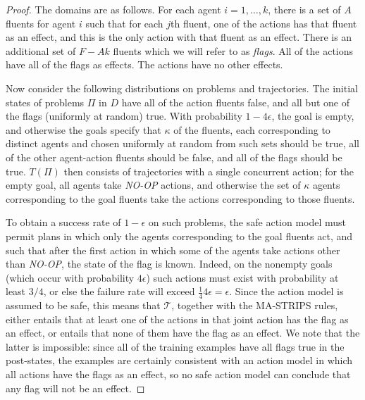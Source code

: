 \documentclass[letterpaper]{article} %
\theoremstyle{definition}
\theoremstyle{remark}
\newcommand{\noop}{\textit{NO-OP}\xspace}
\begin{document}
\begin{proof}
The domains are as follows. For each agent $i=1,\ldots,k$, there is a set of $A$ fluents for agent $i$ such that for each $j$th fluent, one of the actions has that fluent as an effect, and this is the only action with that fluent as an effect. There is an additional set of $F-Ak$ fluents which we will refer to as {\em flags}. All of the actions have all of the flags as effects. The actions have no other effects.

Now consider the following distributions on problems and trajectories. The initial states of problems $\Pi$ in $D$ have all of the action fluents false, and all but one of the flags (uniformly at random) true. With probability $1-4\epsilon$, the goal is empty, and otherwise the goals specify that $\kappa$ of the fluents, each corresponding to distinct agents and chosen uniformly at random from such sets should be true, all of the other agent-action fluents should be false, and all of the flags should be true. $T(\Pi)$ then consists of trajectories with a single concurrent action; for the empty goal, all agents take \noop actions, and otherwise the set of $\kappa$ agents corresponding to the goal fluents take the actions corresponding to those fluents.

To obtain a success rate of $1-\epsilon$ on such problems, the safe action model must permit plans in which only the agents corresponding to the goal fluents act, and such that after the first action in which some of the agents take actions other than \noop, the state of the flag is known. Indeed, on the nonempty goals (which occur with probability $4\epsilon$) such actions must exist with probability at least $3/4$, or else the failure rate will exceed $\frac{1}{4}4\epsilon=\epsilon$. Since the action model is assumed to be safe, this means that $\mathcal{T}$, together with the MA-STRIPS rules, either entails that  at least one of the actions in that joint action has the flag as an effect, or entails that none of them have the flag as an effect. We note that the latter is impossible: since all of the training examples have all flags true in the post-states, the examples are certainly consistent with an action model in which all actions have the flags as an effect, so no safe action model can conclude that any flag will not be an effect.


\end{proof}
\end{document}
